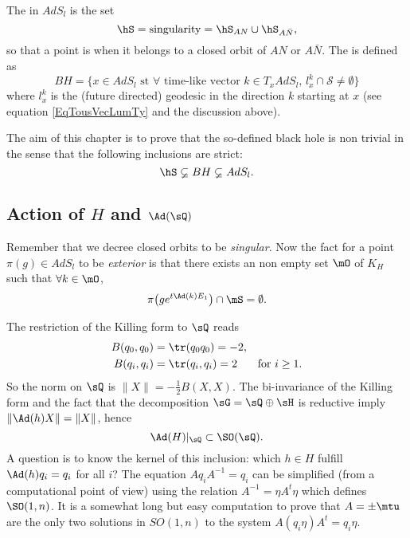\begin{definition}		\label{Singular}
	The  in $AdS_l$ is the set
	\[
		\hS=\text{singularity}=\hS_{AN}\cup\hS_{A\bar N},
	\]
	so that a point is  when it belongs to a closed orbit of $AN$ or $A\bar N$. The  is defined as
	\[
		BH=\{ x\in AdS_{l} \text{ st } \forall \text{ time-like vector } k\in T_xAdS_l,\,  l^k_x\cap\mathcal{S}\neq\emptyset \}
	\]
	where $l^k_x$ is the (future directed) geodesic in the direction $k$ starting at $x$ (see equation \eqref{EqTousVecLumTy} and the discussion above).
\end{definition}

The aim of this chapter is to prove that the so-defined black hole is non trivial in the sense that the following inclusions are strict:
\begin{equation}		\label{EqhSssubBH}
	\hS\varsubsetneq BH\varsubsetneq AdS_l.
\end{equation}

\subsection{Action of \texorpdfstring{$H$}{H} and \texorpdfstring{$\Ad(\sQ)$}{AdQ}}

Remember that we decree closed orbits to be \emph{singular}. Now the fact for a point $\pi(g)\in AdS_l$ to be \emph{exterior} is that there exists an non empty set $\mO$ of $K_H$ such that $\forall k\in\mO$,
\[
	\pi\big( g e^{t\Ad(k)E_1}  \big)\cap\mS=\emptyset.
\]

The restriction of the Killing form to $\sQ$ reads
\begin{subequations}
	\begin{align}
		B(q_0,q_0)     & =\tr(q_0q_0)=-2,                              \\
		B(q_{i},q_{i}) & =\tr(q_{i},q_{i})=2 & \textrm{for $i\geq 1$}.
	\end{align}
\end{subequations}
So the norm on $\sQ$ is $\| X \|=-\frac{ 1 }{2}B(X,X)$. The bi-invariance of the Killing form and the fact that the decomposition $\sG=\sQ\oplus\sH$ is reductive  imply $\| \Ad(h)X \|=\| X \|$, hence
\begin{equation}  \label{EqInclAdHSOq}
	\Ad(H)|_{\sQ}\subset\SO(\sQ).
\end{equation}
A question is to know the kernel of this inclusion: which $h\in H$ fulfill $\Ad(h)q_i=q_i$ for all $i$? The equation $Aq_iA^{-1}=q_i$ can be simplified (from a computational point of view) using the relation $A^{-1}=\eta A^t\eta$ which defines $\SO(1,n)$. It is a somewhat long but easy computation to prove that $A=\pm\mtu$ are the only two solutions in $SO(1,n)$ to the system $A(q_i\eta)A^t=q_i\eta$.

